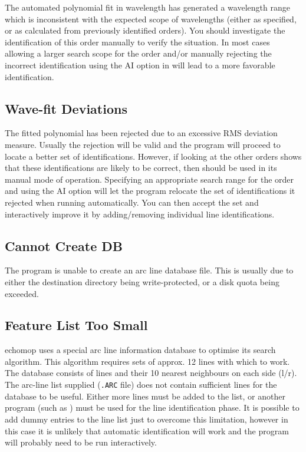 The automated polynomial fit in wavelength has generated a wavelength
range which is inconsistent with the expected scope of wavelengths
(either as specified, or as calculated from previously identified orders).
You should investigate the identification of
this order manually to verify the situation.
In most cases allowing a larger search scope for the order and/or
manually rejecting the incorrect identification using the AI option in
 will
lead to a more favorable identification.

\subsection{ Wave-fit Deviations}

The fitted polynomial has been rejected due to an excessive RMS
deviation measure. Usually the rejection will be valid and the program
will proceed to locate a better set of identifications. However, if
looking at the other orders shows that these
identifications are likely to be correct, then
should be used in its manual mode of operation. Specifying an
appropriate search range for the  order and using the AI option will let
the program relocate the set of identifications it rejected when running
automatically. You can then accept the set and interactively
improve it by adding/removing individual line identifications.

\subsection{ Cannot Create DB}

The program is unable to create an arc line database file.
This is usually due to either the destination directory being
write-protected, or a disk quota being exceeded.

\subsection{ Feature List Too Small}

{\sc echomop} uses a special arc line information database to optimise its
search algorithm. This algorithm requires sets of approx. 12 lines with
which to work. The database consists of lines and their 10 nearest
neighbours on each side (l/r).  The arc-line list supplied (\verb+.ARC+ file)
does not contain sufficient lines for the database to be useful.
Either more lines must be added to the list,  or another program
(such as ) must be used for the line
identification phase. It is
possible to add dummy entries to the line list just to overcome this
limitation, however in this case it is unlikely that automatic
identification will work and the program will probably need to be run
interactively.

